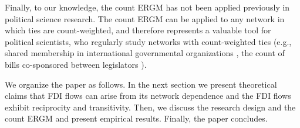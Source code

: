 \documentclass[reqno,onecolumn,letterpaper,12pt]{article}
\begin{document}
Finally, to our knowledge, the count ERGM has not been applied previously in political science research. The count ERGM can be applied to any network in which ties are count-weighted, and therefore represents a valuable tool for political scientists, who regularly study networks with count-weighted ties (e.g., shared membership in international governmental organizations \citep{boehmke2016addressing}, the count of bills co-sponsored between legislators \citep{kirkland2013hypothesis}).






We organize the paper as follows. In the next section %
we present theoretical claims that FDI flows can arise from its network dependence and the FDI flows exhibit reciprocity and transitivity. Then, we discuss the research design and the count ERGM and present empirical results. Finally, the paper concludes.
\end{document}
